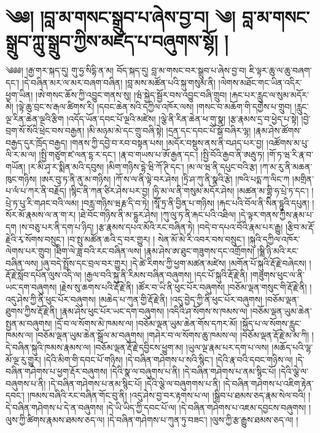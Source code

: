 \setcounter{footnote}{0} 
\chapter{༄༅། །བླ་མ་གསང་སྒྲུབ་པ་ཞེས་བྱ་བ། ༄། བླ་མ་གསང་སྒྲུབ་ཀླུ་སྒྲུབ་ཀྱིས་མཛད་པ་བཞུགས་སྷོ། ། }༄༅༅། །རྒྱ་གར་སྐད་དུ། གུ་ཧྱ་སིདྷི་ན་མ། བོད་སྐད་དུ། བླ་མ་གསང་བར་སྒྲུབ་པ་ཞེས་བྱ་བ། ཇི་ལྟར་ཆུ་ལ་ཆུ་བཞག་དང་། །དེ་བཞིན་མར་ལ་མར་བཞག་བཞིན། །བླ་མས་མཚོན་པའི་སྐུ་གསུམ་ནི། །ལེགས་མཐོང་གང་ཡིན་འདིར་ཕྱག་ཡིན། །ཨེ་གསང་ཆོས་ཀྱི་འབྱུང་གནས་སུ། །ཝཾ་སྐྱེད་སྦྱོར་བས་འབྱུང་བཞི་གྲུབ། །རྐང་པར་རླུང་ལ་སུམ་མདོར་མེ། །ལྟེ་ཆུ་བྲང་ས་རྒལ་ཚིགས་རི། །དབང་ཆེན་སའི་དཀྱིལ་འཁོར་ལས། །གསང་བ་མཆོག་གི་དགྱེས་པ་གྲུབ། །རླུང་ལྔ་རིན་ཆེན་ལྔའི་རྩིག །འདོད་ཡོན་དབང་པོ་ལྔའི་མཛེས། །ལྕེ་ནི་རིན་ཆེན་ཕ་གུ་སྣ། །རྩ་རྣམས་དྲ་བ་ཕྱེད་པ་སྟེ། །བྱེ་བྲག་སོ་སོའི་ཕྲེང་བས་བརྒྱན། །མི་མཉམ་མེ་དང་གྲུ་བཞི་སྟེ། །དྲན་དང་དབང་པོ་སྒོ་བཞིར་ལྷ། །རྣམ་ཤེས་ཚོགས་བརྒྱད་དུར་ཁྲོད་བརྒྱད། །གནས་ཀྱི་དབྱེ་བ་རབ་བསྟན་པས། །མདོར་བསྡུས་ནས་ནི་བཤད་པར་བྱ། །འཚོགས་མ་པུ་ལི་ར་མ་ལ། །སྤྱི་གཙུག་ཛ་ལན་དྷ་ར་དང་། །རྣ་བ་གཡས་པ་ཨོ་རྒྱན་དང་། །སྤྱི་བོའི་རྒྱབ་ནི་ཨརྦུ་ཏ། །གོ་ཏ་ཝ་རི་རྣ་བ་གཡོན། །ར་མི་ཤྭ་ར་སྨིན་མའི་དབུས། །མིག་གཉིས་དྷེ་ཝི་ཀོ་ཊི་དང་། །མ་ལ་ཝ་ནི་དཔུང་བའི་རྩ། །ཀ་མ་རུ་ནི་མཆན་ཁུང་གཉིས། །ཨར་བུ་ཏ་ནི་ནུ་མ་གཉིས། །ཀོ་ས་ལ་ནི་ལྟེ་བར་ཤེས། །ཏྲི་ཤ་ཀུ་ནི་སྣའི་རྩེ། །ཁའི་པདྨ་ཀ་ལིང་ཀ །མགྲིན་པ་ལཾ་པ་ཀར་ནི་བརྗོད། །སྙིང་ནི་ཀན་ཙིར་ཤེས་པར་བྱ། །ཧི་མ་ལ་ནི་གསུམ་མདོར་ཤེས། །མཚན་མ་གྷྲི་ཧ་པྲེ་ཏ་དང་། །པྲེ་ཏ་པུ་རི་གཤང་བའི་ལམ། །བརླ་གཉིས་ཝརྞ་དི་བ་ཏེ། །སཱཽ་ཏྲ་ནི་བྱིན་པ་གཉིས། །རྐང་པའི་བོལ་ནི་སིན་དྷུའི་དཔུན། །སོར་མོ་རྣམས་ལ་ན་ག་ར། །ཐེ་བོང་གཉིས་ནི་མ་དྷུར་ཤེས། །ཀུ་ལུ་ཏ་ནི་རྐང་པའི་འཐིལ། །དེ་ལྟར་གནས་ཀྱིས་རྣམ་པ་དག །ས་བཅུ་པར་ནི་དག་པ་ཉིད། །རྩ་རྣམས་དཔའ་མོའི་རང་བཞིན་ཏེ། །བདེ་བ་དཔའ་བོའི་རྣམ་པར་རྒྱུ། །རྩིབ་མ་རྡོ་རྗེའི་རྭ་སོགས་བསྲུང་། །བ་སྤུ་མཚོན་ཆའི་དྲ་བར་གྱུར། །
སེན་མོ་མེ་རི་འབར་བས་བསྲུང་། །སྐུའི་དཀྱིལ་འཁོར་ལེགས་པར་གྲུབ། །ཐིིག་ལེ་ཟླ་བའི་རང་བཞིན་ལས། །རྣམ་ཤེས་ཨ་ཐུང་གཟུགས་དང་འགྲོགས། །སྷླི་ཉི་མའི་རང་བཞིན་ལས། །ཞུ་བདེ་སྤྲོས་དང་བྲལ་བར་གྱུར། །དེ་ཚེ་རིགས་ཀྱི་ཕྱག་མཚན་མཛེས། །མགོན་པོ་སྐུའི་རྡོ་རྗེ་བཞེངས། །རྡོ་རྗེ་སློབ་དཔོན་ལུས་འདི་ལ། །རྒྱལ་བའི་སྐུ་ནི་རིམས་བཞིན་བཞུགས། །དང་པོ་སྐུའི་རྡོ་རྗེ་ནི། །གཟུགས་ཕུང་ལ་ནི་ཡང་དག་བཞུགས། །རྗེས་སུ་ཆགས་པའི་རྡོ་རྗེ་ནི། །ཚོར་བ་ཡི་ནི་ཕུང་པོར་བཞུགས། །བཅོམ་ལྡན་གསུང་གི་རྡོ་རྗེ་ནི། །འདུ་ཤེས་ཀྱི་ནི་ཕུང་པོར་བཞུགས། །མཆེད་པ་ཀུན་གྱི་རྡོ་རྗེ་ནི། །འདུ་བྱེད་ཀྱི་ནི་ཕུང་པོར་བཞུགས། །བཅོམ་ལྡན་ཐུགས་ཀྱིས་རྡོ་རྗེ་ནི། །རྣམ་ཤེས་ཕུང་པོར་ཡང་དག་བཞུགས། །འདིའི་ཤ་སོགས་ས་ཁམས་ལ། །བཅོམ་ལྡན་ཡུམ་ཆེན་སྤྱན་མ་བཞུགས། །དྲོ་བ་ལ་སོགས་མེ་ཁམས་ལ། །བཅོམ་ལྡན་ཡུམ་ཆེན་གོས་དཀར་མོ། །སྐྱོད་པ་ལ་སོགས་རླུང་ཁམས་ལ། །བཅོམ་ལྡན་ཡུམ་ཆེན་སྒྲོལ་མ་བཞུགས། །གཤེར་བ་ལ་སོགས་ཆུ་ཁམས་ལ། །བཅོམ་ལྡན་རྡོ་རྗེ་མ་མ་ཀི། །དེ་བཞིན་སྐུའི་ཁམས་རྣམས་ལ། །བཅོམ་ལྡན་རྡོ་རྗེ་དབྱིངས་ཕྱུག་མ། །ཡུལ་ལྔ་རྣམ་པར་དག་པ་ལས། །མཆོད་པའི་ལྷ་མོ་ལྔ་རུ་གྱུར། །དེའི་མིག་གི་དབང་པོ་གཉིས། །དེ་བཞིན་གཤེགས་པ་སའི་སྙིང་། །དེའི་རྣ་བའི་དབང་གཉིས་ལ། །དེ་བཞིན་གཤེགས་པ་ཕྱག་རྡོར་བཞུགས། །དེའི་སྣ་ལ་བཞུགས་པ་ནི། །དེ་བཞིན་གཤེགས་པ་ནམ་སྙིང་པོ། །དེའི་ལྕེ་ལ་བཞུགས་པ་ནི། །དེ་བཞིན་གཤེགས་པ་ནམ་སྙིང་པོ། །དེའི་ལྕེ་ལ་བཞུགགས་པ་ནི། །དེ་བཞིན་གཤེགས་པ་འཇིག་རྟེན་དབང་། །ཁམས་བཞིའི་རང་བཞིན་གོང་བུ་ནི། །འདུ་ཤེས་བྱ་བར་རྟགས་པ་ལ། །སྒྲིབ་པ་ཐམས་ཅད་རྣམ་སེལ་བའི། །དེ་བཞིན་གཤེགས་པ་དེ་ན་བཞུགས། །དེ་ཡི་ཡིད་ཀྱི་དབང་པོ་ལ། །དེ་བཞིན་གཤེགས་པ་འཇམ་དབྱངས་བཞུགས། །ལུས་ཀྱི་ཚིགས་རྣམས་ཐམས་ཅད་ལ། །དེ་བཞིན་གཤེགས་པ་ཀུན་ཏུ་བཟང་། །ལུས་ཀྱི་རྩ་རྒྱུས་ཐམས་ཅད་ལ། །
